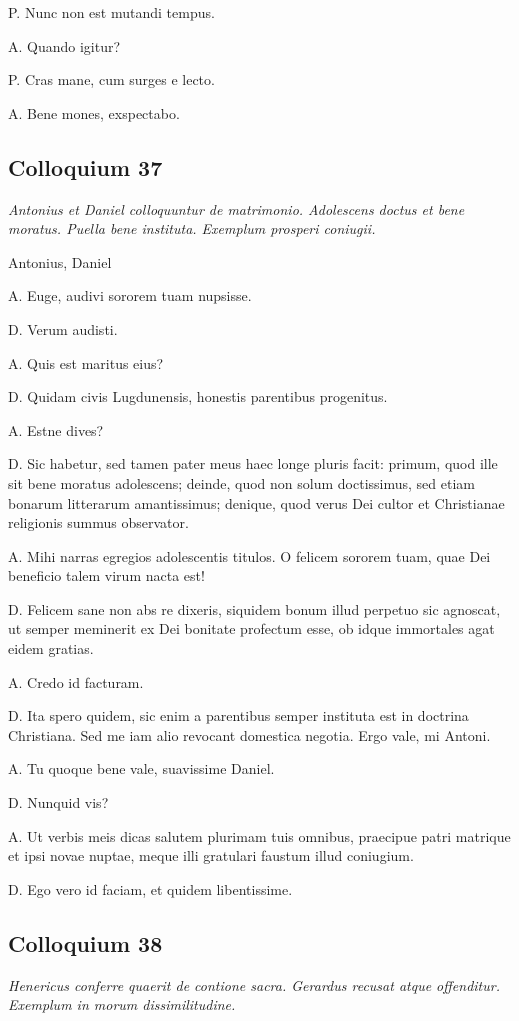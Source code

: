 \documentclass{article}
\begin{document}
P. Nunc non est mutandi tempus. 

A. Quando igitur?

P. Cras mane, cum surges e lecto. 

A. Bene mones, exspectabo.

\subsection{Colloquium 37}
\emph{Antonius et Daniel colloquuntur de matrimonio. Adolescens doctus et bene moratus. Puella bene instituta. Exemplum prosperi coniugii.}

Antonius, Daniel

A. Euge, audivi sororem tuam nupsisse. 

D. Verum audisti. 

A. Quis est maritus eius?

D. Quidam civis Lugdunensis, honestis parentibus progenitus. 

A. Estne dives?

D. Sic habetur, sed tamen pater meus haec longe pluris facit: primum, quod ille sit bene moratus adolescens; deinde, quod non solum doctissimus, sed etiam bonarum litterarum amantissimus; denique, quod verus Dei cultor et Christianae religionis summus observator. 

A. Mihi narras egregios adolescentis titulos. O felicem sororem tuam, quae Dei beneficio talem virum nacta est!

D. Felicem sane non abs re dixeris, siquidem bonum illud perpetuo sic agnoscat, ut semper meminerit ex Dei bonitate profectum esse, ob idque immortales agat eidem gratias. 

A. Credo id facturam. 

D. Ita spero quidem, sic enim a parentibus semper instituta est in doctrina Christiana. Sed me iam alio revocant domestica negotia. Ergo vale, mi Antoni. 

A. Tu quoque bene vale, suavissime Daniel. 

D. Nunquid vis?

A. Ut verbis meis dicas salutem plurimam tuis omnibus, praecipue patri matrique et ipsi novae nuptae, meque illi gratulari faustum illud coniugium. 

D. Ego vero id faciam, et quidem libentissime. 

\subsection{Colloquium 38}
\emph{Henericus conferre quaerit de contione sacra. Gerardus recusat atque offenditur. Exemplum in morum dissimilitudine.}
\end{document}
